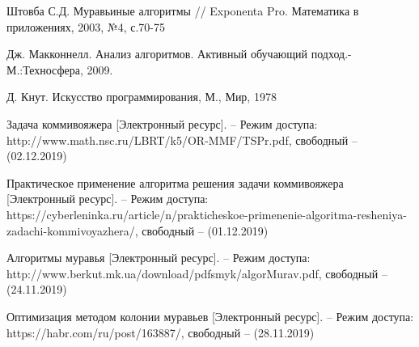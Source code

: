 \documentclass[a4paper,12pt]{article}
\begin{document}
\newpage
{}
\begin{thebibliography}{7}

Штовба С.Д. Муравьиные алгоритмы // Exponenta Pro. Математика в приложениях, 2003, №4, с.70-75

Дж. Макконнелл. Анализ алгоритмов. Активный 
обучающий 
подход.-М.:Техносфера, 2009.

Д. Кнут. Искусство программирования, М., Мир, 1978

Задача коммивояжера  [Электронный ресурс]. – Режим доступа: http://www.math.nsc.ru/LBRT/k5/OR-MMF/TSPr.pdf, свободный – (02.12.2019)

Практическое применение алгоритма решения задачи коммивояжера [Электронный ресурс]. – Режим доступа: https://cyberleninka.ru/article/n/prakticheskoe-primenenie-algoritma-resheniya-zadachi-kommivoyazhera/, свободный – (01.12.2019)

Алгоритмы муравья [Электронный ресурс]. – Режим доступа: http://www.berkut.mk.ua/download/pdfsmyk/algorMurav.pdf, свободный – (24.11.2019)

Оптимизация методом колонии муравьев [Электронный ресурс]. – Режим доступа: https://habr.com/ru/post/163887/, свободный – (28.11.2019)

\end{thebibliography}
\end{document}
